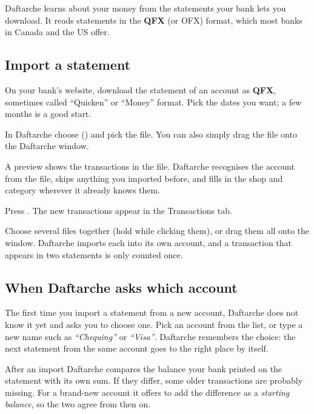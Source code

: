 \documentclass[11pt]{article}
\begin{document}
Daftarche learns about your money from the statements your bank lets you download. It reads
statements in the \textbf{QFX} (or OFX) format, which most banks in Canada and the US offer.

\subsection{Import a statement}
\begin{steps}
  \item On your bank's website, download the statement of an account as \textbf{QFX}, sometimes
        called “Quicken” or “Money” format. Pick the dates you want; a few months is a good start.
  \item In Daftarche choose  () and pick the file.
        You can also simply drag the file onto the Daftarche window.
  \item A preview shows the transactions in the file. Daftarche recognises the account from the
        file, skips anything you imported before, and fills in the shop and category wherever
        it already knows them.
  \item Press . The new transactions appear in the Transactions tab.
\end{steps}

\begin{tip}
Choose several files together (hold  while clicking them), or drag them all onto the window.
Daftarche imports each into its own account, and a transaction that appears in two statements
is only counted once.
\end{tip}


\subsection{When Daftarche asks which account}
The first time you import a statement from a new account, Daftarche does not know it yet and asks
you to choose one. Pick an account from the list, or type a new name such as
\emph{“Chequing”} or \emph{“Visa”}. Daftarche remembers the choice: the next statement from the same
account goes to the right place by itself.

\begin{careful}
After an import Daftarche compares the balance your bank printed on the statement with its own
sum. If they differ, some older transactions are probably missing. For a brand-new account it
offers to add the difference as a \emph{starting balance}, so the two agree from then on.
\end{careful}
\end{document}
